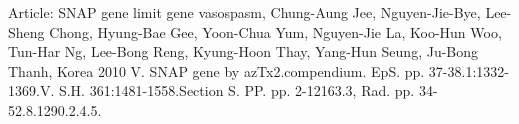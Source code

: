 \documentclass{article}
\begin{document}
Article: SNAP gene limit gene vasospasm, Chung-Aung Jee, Nguyen-Jie-Bye, Lee-Sheng Chong, Hyung-Bae Gee, Yoon-Chua Yum, Nguyen-Jie La, Koo-Hun Woo, Tun-Har Ng, Lee-Bong Reng, Kyung-Hoon Thay, Yang-Hun Seung, Ju-Bong Thanh, Korea 2010 V. SNAP gene by azTx2.compendium. EpS. pp. 37-38.1:1332-1369.V. S.H. 361:1481-1558.Section S. PP. pp. 2-12163.3, Rad. pp. 34-52.8.1290.2.4.5.
\end{document}
